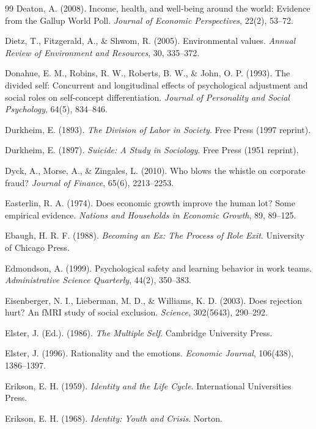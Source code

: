 \begin{thebibliography}{99}
Deaton, A. (2008).
Income, health, and well-being around the world: Evidence from the Gallup World Poll.
\textit{Journal of Economic Perspectives}, 22(2), 53--72.

Dietz, T., Fitzgerald, A., \& Shwom, R. (2005).
Environmental values.
\textit{Annual Review of Environment and Resources}, 30, 335--372.

Donahue, E. M., Robins, R. W., Roberts, B. W., \& John, O. P. (1993).
The divided self: Concurrent and longitudinal effects of psychological adjustment and social roles on self-concept differentiation.
\textit{Journal of Personality and Social Psychology}, 64(5), 834--846.

Durkheim, E. (1893).
\textit{The Division of Labor in Society}.
Free Press (1997 reprint).

Durkheim, E. (1897).
\textit{Suicide: A Study in Sociology}.
Free Press (1951 reprint).

Dyck, A., Morse, A., \& Zingales, L. (2010).
Who blows the whistle on corporate fraud?
\textit{Journal of Finance}, 65(6), 2213--2253.

Easterlin, R. A. (1974).
Does economic growth improve the human lot? Some empirical evidence.
\textit{Nations and Households in Economic Growth}, 89, 89--125.

Ebaugh, H. R. F. (1988).
\textit{Becoming an Ex: The Process of Role Exit}.
University of Chicago Press.

Edmondson, A. (1999).
Psychological safety and learning behavior in work teams.
\textit{Administrative Science Quarterly}, 44(2), 350--383.

Eisenberger, N. I., Lieberman, M. D., \& Williams, K. D. (2003).
Does rejection hurt? An fMRI study of social exclusion.
\textit{Science}, 302(5643), 290--292.

Elster, J. (Ed.). (1986).
\textit{The Multiple Self}.
Cambridge University Press.

Elster, J. (1996).
Rationality and the emotions.
\textit{Economic Journal}, 106(438), 1386--1397.

Erikson, E. H. (1959).
\textit{Identity and the Life Cycle}.
International Universities Press.

Erikson, E. H. (1968).
\textit{Identity: Youth and Crisis}.
Norton.


\end{thebibliography}
